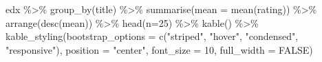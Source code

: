 \documentclass[
]{article}
\newenvironment{Shaded}{}{}
\newcommand{\AttributeTok}[1]{\textcolor[rgb]{0.49,0.56,0.16}{#1}}
\newcommand{\ConstantTok}[1]{\textcolor[rgb]{0.53,0.00,0.00}{#1}}
\newcommand{\DecValTok}[1]{\textcolor[rgb]{0.25,0.63,0.44}{#1}}
\newcommand{\FunctionTok}[1]{\textcolor[rgb]{0.02,0.16,0.49}{#1}}
\newcommand{\NormalTok}[1]{#1}
\newcommand{\SpecialCharTok}[1]{\textcolor[rgb]{0.25,0.44,0.63}{#1}}
\newcommand{\StringTok}[1]{\textcolor[rgb]{0.25,0.44,0.63}{#1}}
\begin{document}
\begin{Shaded}
\begin{Highlighting}[]
\NormalTok{edx }\SpecialCharTok{\%\textgreater{}\%}
   \FunctionTok{group\_by}\NormalTok{(title) }\SpecialCharTok{\%\textgreater{}\%}
   \FunctionTok{summarise}\NormalTok{(}\AttributeTok{mean =} \FunctionTok{mean}\NormalTok{(rating)) }\SpecialCharTok{\%\textgreater{}\%}
   \FunctionTok{arrange}\NormalTok{(}\FunctionTok{desc}\NormalTok{(mean)) }\SpecialCharTok{\%\textgreater{}\%}
   \FunctionTok{head}\NormalTok{(}\AttributeTok{n=}\DecValTok{25}\NormalTok{) }\SpecialCharTok{\%\textgreater{}\%}
   \FunctionTok{kable}\NormalTok{() }\SpecialCharTok{\%\textgreater{}\%}
   \FunctionTok{kable\_styling}\NormalTok{(}\AttributeTok{bootstrap\_options =} \FunctionTok{c}\NormalTok{(}\StringTok{"striped"}\NormalTok{, }\StringTok{"hover"}\NormalTok{, }\StringTok{"condensed"}\NormalTok{, }\StringTok{"responsive"}\NormalTok{),}
                 \AttributeTok{position =} \StringTok{"center"}\NormalTok{,}
                 \AttributeTok{font\_size =} \DecValTok{10}\NormalTok{,}
                 \AttributeTok{full\_width =} \ConstantTok{FALSE}\NormalTok{)}
\end{Highlighting}
\end{Shaded}
\end{document}
